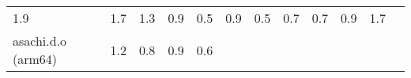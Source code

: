\documentclass[parskip=half]{scrartcl}
\begin{document}
\begin{table}[h]
\begin{tabular}{@{}llllllllllll@{}}
\begin{minipage}[t]{0.05\columnwidth}
1.9\strut
\end{minipage} & \begin{minipage}[t]{0.05\columnwidth}\raggedright\strut
1.7\strut
\end{minipage} & \begin{minipage}[t]{0.05\columnwidth}\raggedright\strut
1.3\strut
\end{minipage} & \begin{minipage}[t]{0.05\columnwidth}\raggedright\strut
0.9\strut
\end{minipage} & \begin{minipage}[t]{0.05\columnwidth}\raggedright\strut
0.5\strut
\end{minipage} & \begin{minipage}[t]{0.05\columnwidth}\raggedright\strut
0.9\strut
\end{minipage} & \begin{minipage}[t]{0.05\columnwidth}\raggedright\strut
0.5\strut
\end{minipage} & \begin{minipage}[t]{0.05\columnwidth}\raggedright\strut
0.7\strut
\end{minipage} & \begin{minipage}[t]{0.05\columnwidth}\raggedright\strut
0.7\strut
\end{minipage} & \begin{minipage}[t]{0.05\columnwidth}\raggedright\strut
0.9\strut
\end{minipage} & \begin{minipage}[t]{0.05\columnwidth}\raggedright\strut
1.7\strut
\end{minipage}\tabularnewline
\begin{minipage}[t]{0.12\columnwidth}\raggedright\strut
asachi.d.o (arm64)\strut
\end{minipage} & \begin{minipage}[t]{0.05\columnwidth}\raggedright\strut
1.2\strut
\end{minipage} & \begin{minipage}[t]{0.05\columnwidth}\raggedright\strut
0.8\strut
\end{minipage} & \begin{minipage}[t]{0.05\columnwidth}\raggedright\strut
0.9\strut
\end{minipage} & \begin{minipage}[t]{0.05\columnwidth}\raggedright\strut
0.6\strut
\end{minipage} & \begin{minipage}[t]{0.05\columnwidth}\raggedright\strut

\end{minipage}
\end{tabular}
\end{table}
\end{document}
